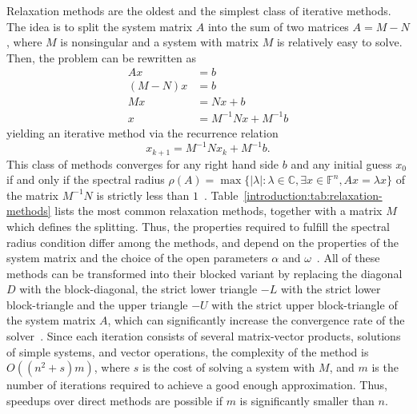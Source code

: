 Relaxation methods are the oldest and the simplest class of iterative methods.
The idea is to split the system matrix $A$ into the sum of two matrices $A = M -
N$, where $M$ is nonsingular and a system with matrix $M$ is relatively easy to
solve. Then, the problem can be rewritten as
\begin{align}
Ax &= b\\
(M - N)x &= b\\
Mx &= Nx + b \\
x &= M^{-1}Nx + M^{-1}b
\end{align}
yielding an iterative method via the recurrence relation
\begin{equation}
    x_{k+1} = M^{-1}Nx_k + M^{-1}b. \label{introduction:eqn:relaxation}
\end{equation}
This class of methods converges for any right hand side $b$ and any initial
guess $x_0$  if and only if the spectral radius $\rho(A) = \max \{ \vert \lambda
\vert : \lambda \in \mathbb{C}, \exists x \in \mathbb{F}^n, Ax = \lambda x \}$
of the matrix $M^{-1}N$ is strictly less than $1$~\cite{demmel,saad}.
Table~\ref{introduction:tab:relaxation-methods} lists the most common relaxation
methods, together with a matrix $M$ which defines the splitting. Thus, the
properties required to fulfill the spectral radius condition differ among the
methods, and depend on the properties of the system matrix and the choice of the
open parameters $\alpha$ and $\omega$~\cite{barrettemplates}. All of these
methods can be transformed into their blocked variant by replacing the diagonal
$D$ with the block-diagonal, the strict lower triangle $-L$ with the strict
lower block-triangle and the upper triangle $-U$ with the strict upper
block-triangle of the system matrix $A$, which can significantly increase the
convergence rate of the solver~\cite{saad}.  Since each iteration consists of
several matrix-vector products, solutions of simple systems, and vector
operations,
the complexity of the method is $O((n^2 + s) m)$, where $s$ is the cost of
solving a system with $M$, and $m$ is the number of iterations required to
achieve a good enough approximation. Thus, speedups over direct methods are
possible if $m$ is significantly smaller than $n$.

